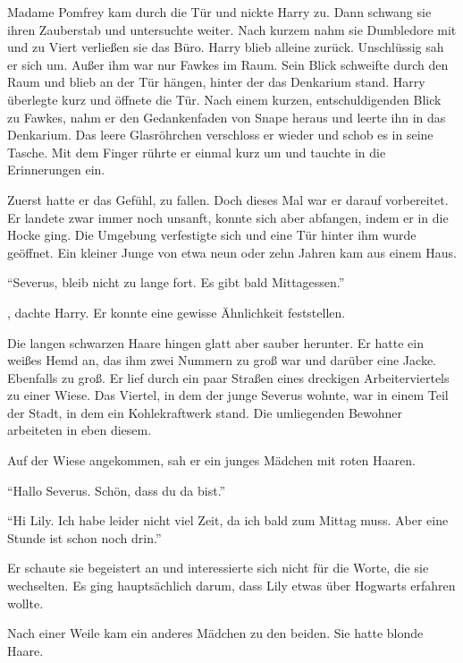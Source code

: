 Madame Pomfrey kam durch die Tür und nickte Harry zu. Dann schwang sie ihren Zauberstab und untersuchte weiter. Nach kurzem nahm sie Dumbledore mit und zu Viert verließen sie das Büro. Harry blieb alleine zurück. Unschlüssig sah er sich um. Außer ihm war nur Fawkes im Raum. Sein Blick schweifte durch den Raum und blieb an der Tür hängen, hinter der das Denkarium stand. Harry überlegte kurz und  öffnete die Tür. Nach einem kurzen, entschuldigenden Blick zu Fawkes, nahm er den Gedankenfaden von Snape heraus und leerte ihn in das Denkarium. Das leere Glasröhrchen verschloss er wieder und schob es in seine Tasche. Mit dem Finger rührte er einmal kurz um und tauchte in die Erinnerungen ein.

\begin{traum}
Zuerst hatte er das Gefühl, zu fallen. Doch dieses Mal war er darauf vorbereitet. Er landete zwar immer noch unsanft, konnte sich aber abfangen, indem er in die Hocke ging. Die Umgebung verfestigte sich und eine Tür hinter ihm wurde geöffnet. Ein kleiner Junge von etwa neun oder zehn Jahren kam aus einem Haus.

\enquote{Severus, bleib nicht zu lange fort. Es gibt bald Mittagessen.}

, dachte Harry. Er konnte eine gewisse Ähnlichkeit feststellen.

Die langen schwarzen Haare hingen glatt aber sauber herunter. Er hatte ein weißes Hemd an, das ihm zwei Nummern zu groß war und darüber eine Jacke. Ebenfalls zu groß. Er lief durch ein paar Straßen eines dreckigen Arbeiterviertels zu einer Wiese. Das Viertel, in dem der junge Severus wohnte, war in einem Teil der Stadt, in dem ein Kohlekraftwerk stand. Die umliegenden Bewohner arbeiteten in eben diesem.

Auf der Wiese angekommen, sah er ein junges Mädchen mit roten Haaren.

\enquote{Hallo Severus. Schön, dass du da bist.}

\enquote{Hi Lily. Ich habe leider nicht viel Zeit, da ich bald zum Mittag muss. Aber eine Stunde ist schon noch drin.}

 Er schaute sie begeistert an und interessierte sich nicht für die Worte, die sie wechselten. Es ging hauptsächlich darum, dass Lily etwas über Hogwarts erfahren wollte.

Nach einer Weile kam ein anderes Mädchen zu den beiden. Sie hatte blonde Haare.


\end{traum}
